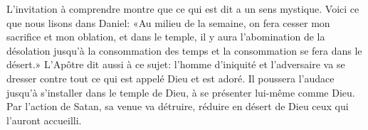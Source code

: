 L'invitation à comprendre montre que ce qui est dit a un sens mystique.
Voici ce que nous lisons dans Daniel:
	«Au milieu de la semaine, on fera cesser mon sacrifice et mon oblation,
	et dans le temple, il y aura l'abomination de la désolation
		jusqu'à la consommation des temps
	et la consommation se fera dans le désert.»
L'Apôtre dit aussi à ce sujet:
	l'homme d'iniquité et l'adversaire va se dresser
	contre tout ce qui est appelé Dieu et est adoré.
Il poussera l'audace jusqu'à s'installer dans le temple de Dieu,
	à se présenter lui-même comme Dieu.
Par l'action de Satan, sa venue va détruire, réduire en désert de Dieu
		ceux qui l'auront accueilli.